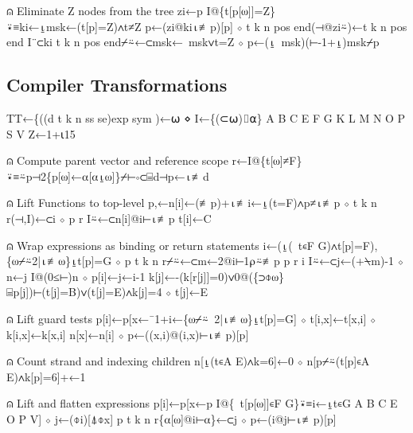 \documentclass{article}%
\begin{document}
⍝ Eliminate Z nodes from the tree
         zi←p I@\{t[p[⍵]]=Z\}⍣≡ki←⍸msk←(t[p]=Z)∧t≠Z
         p←(zi@ki⍳≢p)[p] ⋄ t k n pos end(⊣@zi⍨)←t k n pos end I¨⊂ki
         t k n pos end⌿⍨←⊂msk←~msk∨t=Z ⋄ p←(⍸~msk)(⊢-1+⍸)msk⌿p
\nwendcode{}\nwdocspar

\subsection{Compiler Transformations}

\nwenddocs{}\endmoddef\nwstartdeflinemarkup{}\nwenddeflinemarkup
 TT←\{((d t k n ss se)exp sym )←⍵ ⋄ I←\{(⊂⍵)⌷⍺\}
         A B C E F G K L M N O P S V Z←1+⍳15

⍝ Compute parent vector and reference scope
         r←I@\{t[⍵]≠F\}⍣≡⍨p⊣2\{p[⍵]←⍺[⍺⍸⍵]\}⌿⊢∘⊂⌸d⊣p←⍳≢d

⍝ Lift Functions to top-level
         p,←n[i]←(≢p)+⍳≢i←⍸(t=F)∧p≠⍳≢p ⋄ t k n r(⊣,I)←⊂i ⋄ p r I⍨←⊂n[i]@i⊢⍳≢p
         t[i]←C

⍝ Wrap expressions as binding or return statements
         i←(⍸(~t∊F G)∧t[p]=F),\{⍵⌿⍨2|⍳≢⍵\}⍸t[p]=G ⋄ p t k n r⌿⍨←⊂m←2@i⊢1⍴⍨≢p
         p r i I⍨←⊂j←(+⍀m)-1 ⋄ n←j I@(0≤⊢)n ⋄ p[i]←j←i-1
         k[j]←-(k[r[j]]=0)∨0@(\{⊃⌽⍵\}⌸p[j])⊢(t[j]=B)∨(t[j]=E)∧k[j]=4 ⋄ t[j]←E

⍝ Lift guard tests
         p[i]←p[x←¯1+i←\{⍵⌿⍨~2|⍳≢⍵\}⍸t[p]=G] ⋄ t[i,x]←t[x,i] ⋄ k[i,x]←k[x,i]
         n[x]←n[i] ⋄ p←((x,i)@(i,x)⊢⍳≢p)[p]

⍝ Count strand and indexing children
         n[⍸(t∊A E)∧k=6]←0 ⋄ n[p⌿⍨(t[p]∊A E)∧k[p]=6]+←1

⍝ Lift and flatten expressions
         p[i]←p[x←p I@\{~t[p[⍵]]∊F G\}⍣≡i←⍸t∊G A B C E O P V] ⋄ j←(⌽i)[⍋⌽x]
         p t k n r\{⍺[⍵]@i⊢⍺\}←⊂j ⋄ p←(i@j⊢⍳≢p)[p]
\end{document}
